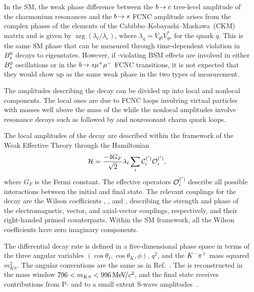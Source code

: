 In the SM, the weak phase difference between the $b\!\rightarrow c$ tree-level amplitude of the charmonium resonances and the $b\!\rightarrow s$ FCNC amplitude arises from the complex phases of the elements of the Cabibbo--Kobayashi--Maskawa~(CKM) matrix and is given by $\arg(\lambda_t/\lambda_c)$, where $\lambda_q=V_{qb}V^*_{qs}$ for the quark $q$. This is the same SM phase that can be measured through time-dependent \CP violation in ${{B}^0_{s}}$ decays to \CP eigenstates. However, if \CP-violating BSM effects are involved in either ${{B}^0_{s}}$ oscillations or in the $b\!\rightarrow s{\mu^+\mu^-}$ FCNC transitions, it is not expected that they would show up as the same weak phase in the two types of measurement.

The amplitudes describing the decay can be divided up into local and nonlocal components. The local ones are due to FCNC loops involving virtual particles with masses well above the mass of the \Bdb while the nonlocal amplitudes involve resonance decays such as \decay{\Bdb}{\jpsi\Kstarzb} followed by \decay{\jpsi}{\mup\mun} and nonresonant charm quark loops.

The local amplitudes of the \BdbToKstbMuMu decay are described within the framework of the Weak Effective Theory through the Hamiltonian~\cite{Buras:1998raa}
\begin{align}
    \mathcal{H} = \frac{-4 G_F}{\sqrt{2}} \lambda_t \sum_i \C{i} ^{(')} \Ope{i} ^{(')},
    \label{eq:WC}
\end{align}
where $G_F$ is the Fermi constant. The effective operators $\Ope{i} ^{(')}$ describe all possible interactions between the initial and final state. The relevant couplings for the \BdbToKstbMuMu decay are the Wilson coefficients , , and , describing the strength and phase of the electromagnetic, vector, and axial-vector couplings, respectively, and their right-handed primed counterparts. Within the SM framework, all the Wilson coefficients have zero imaginary components.

The \BdbToKstbMuMu differential decay rate is defined in a five-dimensional phase space in terms of the three angular variables $(\cos\theta_\ell, \cos\theta_K, \phi)$, $q^2$, and the ${{K}^-}{{\pi}^+}$ mass squared $m_{K\pi}^2$. The angular conventions are the same as in Ref.~\cite{LHCb-PAPER-2013-019}.
The \Kstarzb is reconstructed in the mass window \mbox{$796 < m_{K\pi} < 996\text{\,Me\kern -0.1em V\!/}c^2$}, and the final state receives contributions from P- and to a small extent S-wave amplitudes~\cite{LHCb-PAPER-2025-041}.

